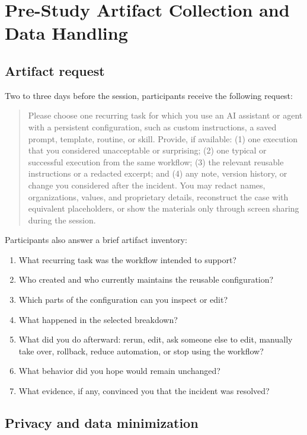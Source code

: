 \section{Pre-Study Artifact Collection and Data Handling}
\label{app:artifacts}

\subsection{Artifact request}

Two to three days before the session, participants receive the following
request:

\begin{quote}
Please choose one recurring task for which you use an AI assistant or agent with
a persistent configuration, such as custom instructions, a saved prompt,
template, routine, or skill. Provide, if available: (1) one execution that you
considered unacceptable or surprising; (2) one typical or successful execution
from the same workflow; (3) the relevant reusable instructions or a redacted
excerpt; and (4) any note, version history, or change you considered after the
incident. You may redact names, organizations, values, and proprietary details,
reconstruct the case with equivalent placeholders, or show the materials only
through screen sharing during the session.
\end{quote}

Participants also answer a brief artifact inventory:

\begin{enumerate}[leftmargin=*]
    \item What recurring task was the workflow intended to support?
    \item Who created and who currently maintains the reusable configuration?
    \item Which parts of the configuration can you inspect or edit?
    \item What happened in the selected breakdown?
    \item What did you do afterward: rerun, edit, ask someone else to edit,
    manually take over, rollback, reduce automation, or stop using the workflow?
    \item What behavior did you hope would remain unchanged?
    \item What evidence, if any, convinced you that the incident was resolved?
\end{enumerate}

\subsection{Privacy and data minimization}

